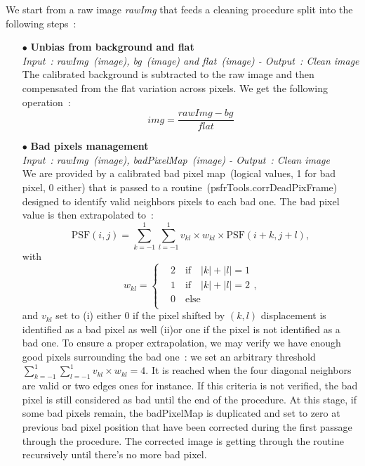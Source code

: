 \documentclass[12pt]{article}
\newcommand{\module}[1]{\left\vert #1 \right\vert}
\begin{document}
We start from a raw image \emph{rawImg} that feeds a cleaning procedure split into the following steps~:
\begin{itemize}
	\item[$\bullet$] \textbf{Unbias from background and flat}\\
	 \emph{Input~: rawImg~(image), bg~(image) and flat~(image) - Output~: Clean image}\\ The calibrated background is subtracted to the raw image and then compensated from the flat variation across pixels. We get the following operation~:
	  \begin{equation}
		img = \dfrac{rawImg - bg}{flat}
	  \end{equation}
	 
	\item[$\bullet$] \textbf{Bad pixels management}\\
	\emph{Input~: rawImg~(image), badPixelMap~(image) - Output~: Clean image}\\
	 We are provided by a calibrated bad pixel map~(logical values, 1 for bad pixel, 0 either) that is passed to a routine~(psfrTools.corrDeadPixFrame) designed to identify valid neighbors pixels to each bad one. The bad pixel value is then extrapolated to~:
	 \begin{equation}	 
	 \text{PSF}(i,j) =  \sum_{k=-1}^{1}\sum_{l=-1}^{1}  v_{kl}\times w_{kl}\times \text{PSF}(i+k,j+l),	 	
	 \end{equation}
	 with
	  \begin{equation}
	  	w_{kl} = \left\lbrace  
	  	\begin{aligned}		  	
		  	& 2\quad \text{if}\quad \module{k} + \module{l} =1\\
		  	& 1\quad \text{if}\quad \module{k} + \module{l} =2\\
		  	& 0\quad \text{else}\\
	  	\end{aligned}
	  	\right.,
	  \end{equation}
	and $v_{kl}$ set to (i) either 0 if the pixel shifted by $(k,l)$ displacement is identified as a bad pixel as well (ii)or one if the pixel is not identified as a bad one. To ensure a proper extrapolation, we may verify we have enough good pixels surrounding the bad one~: we set an arbitrary threshold $\sum_{k=-1}^{1}\sum_{l=-1}^{1}  v_{kl}\times w_{kl} = 4$. It is reached when the four diagonal neighbors are valid or two edges ones for instance. If this criteria is not verified, the bad pixel is still considered as bad until the end of the procedure. At this stage, if some bad pixels remain, the badPixelMap is duplicated and set to zero at previous bad pixel position that have been corrected during the first passage through the procedure. The corrected image is getting through the routine recursively until there's no more bad pixel.
	

\end{itemize}
\end{document}
